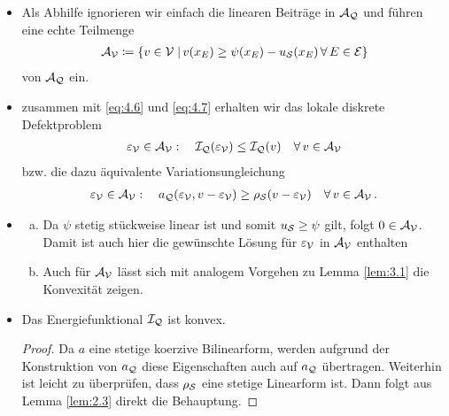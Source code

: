 \begin{itemize}
\item Als Abhilfe ignorieren wir einfach die linearen Beiträge in $\mathcal A_{\mathcal Q}$ und führen eine echte Teilmenge 
\begin{align}\label{eq:4.7}
	\mathcal A_{\mathcal V} \coloneqq \{v \in \mathcal V \;\vert\, v(x_E) \ge \psi(x_E)-u_{\mathcal S}(x_E) \, \forall \, E \in \mathcal E\}
\end{align}
von $\mathcal A_{\mathcal Q}$ ein.

\item zusammen mit \eqref{eq:4.6} und \eqref{eq:4.7} erhalten wir das lokale diskrete Defektproblem
\begin{align}\label{eq:4.8}
	\varepsilon_{\mathcal V} \in \mathcal A_{\mathcal V} : \quad \mathcal I_{\mathcal Q}(\varepsilon_{\mathcal V}) \le \mathcal I_{\mathcal Q} (v) \quad \forall \, v \in \mathcal A_{\mathcal V}
\end{align}
bzw. die dazu äquivalente Variationsungleichung
\begin{align}\label{eq:4.9}
	\varepsilon_{\mathcal V} \in \mathcal A_{\mathcal V} : \quad a_{\mathcal Q} (\varepsilon_{\mathcal V},v-\varepsilon_{\mathcal V})\ge \rho_{\mathcal S} (v-\varepsilon_{\mathcal V}) \quad \forall \, v \in \mathcal A_{\mathcal V} \, .
\end{align}

\item
\begin{bem}
\begin{enumerate}[(a)]
\item Da $\psi$ stetig stückweise linear ist und somit $u_{\mathcal S} \ge \psi$ gilt, folgt $0 \in \mathcal A_{\mathcal V}$. Damit ist auch hier die gewünschte Lösung für $\varepsilon_{\mathcal V}$ in $\mathcal A_{\mathcal V}$ enthalten
\item	Auch für $\mathcal A_{\mathcal V}$ lässt sich mit analogem Vorgehen zu Lemma \ref{lem:3.1} die Konvexität zeigen.
\end{enumerate}
\end{bem}

\item
\begin{lemma}
Das Energiefunktional $\mathcal I_{\mathcal Q}$ ist konvex.
\end{lemma}

\begin{proof}
Da $a$ eine stetige koerzive Bilinearform, werden aufgrund der Konstruktion von $a_{\mathcal Q}$ diese Eigenschaften auch auf $a_{\mathcal Q}$ übertragen. Weiterhin ist leicht zu überprüfen, dass $\rho_{\mathcal S}$ eine stetige Linearform ist. Dann folgt aus Lemma \ref{lem:2.3} direkt die Behauptung.
\end{proof}


\end{itemize}
